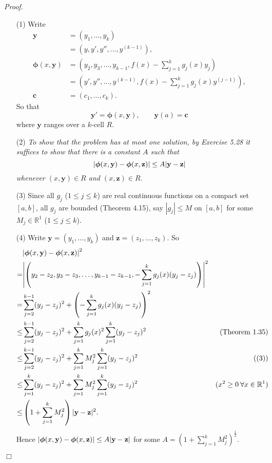 \documentclass{article}
\begin{document}
\emph{Proof.}
\begin{enumerate}
\item[(1)]
Write
\begin{align*}
  \mathbf{y}
  &= (y_1, \ldots, y_k) \\
  &= \left(y, y', y'', \ldots, y^{(k-1)}\right), \\
  \bm{\phi}(x, \mathbf{y})
  &= \left(y_2, y_3, \ldots, y_{k-1}, f(x) - \sum_{j=1}^{k}{g_j(x)y_j}\right) \\
  &= \left(y', y'', \ldots, y^{(k-1)}, f(x) - \sum_{j=1}^{k}{g_j(x)y^{(j-1)}}\right), \\
  \mathbf{c}
  &= (c_1, \ldots, c_k).
\end{align*}
So that
\[
  \mathbf{y}' = \bm{\phi}(x,\mathbf{y}), \qquad
  \mathbf{y}(a) = \mathbf{c}
\]
where $\mathbf{y}$ ranges over a $k$-cell $R$.

\item[(2)]
\emph{To show that the problem has at most one solution, by Exercise 5.28
it suffices to show that there is a constant $A$ such that
\[
  \abs{ \bm{\phi}(x,\mathbf{y}) - \bm{\phi}(x,\mathbf{z}) }
  \leq A \abs{ \mathbf{y} - \mathbf{z} }
\]
whenever $(x,\mathbf{y}) \in R$ and $(x,\mathbf{z}) \in R$.}

\item[(3)]
Since all $g_j$ ($1 \leq j \leq k$) are real continuous functions on a compact set $[a,b]$,
all $g_j$ are bounded (Theorem 4.15),
say $|g_j| \leq M$ on $[a,b]$ for some $M_j \in \mathbb{R}^1$ ($1 \leq j \leq k$).

\item[(4)]
Write $\mathbf{y} = (y_{1}, \ldots, y_{k})$
and $\mathbf{z} = (z_{1}, \ldots, z_{k})$.
So
\begin{align*}
  &\abs{ \bm{\phi}(x,\mathbf{y}) - \bm{\phi}(x,\mathbf{z}) }^2 \\
  =&
  \abs{ \left(y_{2} - z_{2}, y_{3} - z_{3}, \ldots, y_{k-1} - z_{k-1},
    - \sum_{j=1}^{k}{g_j(x)(y_{j} - z_{j})}\right) }^2 \\
  =&
  \sum_{j=2}^{k-1} (y_{j} - z_{j})^2
    + \left( -\sum_{j=1}^{k}{g_j(x)(y_{j} - z_{j})} \right)^2 \\
  \leq&
  \sum_{j=2}^{k-1} (y_{j} - z_{j})^2
    + \sum_{j=1}^{k} g_j(x)^2 \sum_{j=1}^{k}(y_{j} - z_{j})^2
    &(\text{Theorem 1.35}) \\
  \leq&
  \sum_{j=2}^{k-1} (y_{j} - z_{j})^2
    + \sum_{j=1}^{k} M_j^2 \sum_{j=1}^{k}(y_{j} - z_{j})^2
    &((3)) \\
  \leq&
  \sum_{j=1}^{k} (y_{j} - z_{j})^2
    + \sum_{j=1}^{k} M_j^2 \sum_{j=1}^{k}(y_{j} - z_{j})^2
    &(x^2 \geq 0 \: \forall x \in \mathbb{R}^1) \\
  \leq&
   \left( 1 + \sum_{j=1}^{k} M_j^2 \right) |\mathbf{y} - \mathbf{z}|^2.
\end{align*}
Hence
$\abs{ \bm{\phi}(x,\mathbf{y}) - \bm{\phi}(x,\mathbf{z}) }
\leq A \abs{ \mathbf{y} - \mathbf{z} }$
for some $A = \left( 1 + \sum_{j=1}^{k} M_j^2 \right)^{\frac{1}{2}}$.
\end{enumerate}
$\Box$ \\\\



\end{document}
